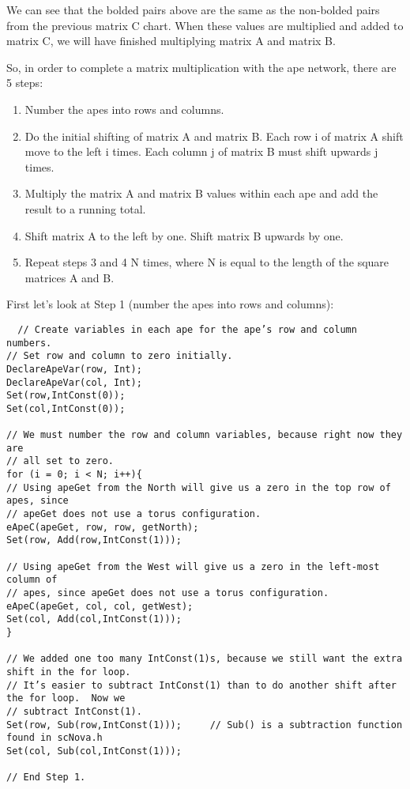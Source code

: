 \documentclass[10pt]{article}
\begin{document}
We can see that the bolded pairs above are the same as the non-bolded pairs from the previous matrix C chart.  When these values are multiplied and added to matrix C, we will have finished multiplying matrix A and matrix B. \par
So, in order to complete a matrix multiplication with the ape network, there are 5 steps: \par
\begin{enumerate}
\item Number the apes into rows and columns.
\item Do the initial shifting of matrix A and matrix B.  Each row i of matrix A shift move to the left i times.  Each column j of matrix B must shift upwards j times.
\item Multiply the matrix A and matrix B values within each ape and add the result to a running total.
\item Shift matrix A to the left by one.  Shift matrix B upwards by one. \par
\item Repeat steps 3 and 4 N times, where N is equal to the length of the square matrices A and B.
\end{enumerate}
First let’s look at Step 1 (number the apes into rows and columns): \par

\begin{verbatim}
  // Create variables in each ape for the ape’s row and column numbers.
// Set row and column to zero initially.
DeclareApeVar(row, Int);
DeclareApeVar(col, Int);
Set(row,IntConst(0));
Set(col,IntConst(0));

// We must number the row and column variables, because right now they are 
// all set to zero.
for (i = 0; i < N; i++){
// Using apeGet from the North will give us a zero in the top row of apes, since
// apeGet does not use a torus configuration.
eApeC(apeGet, row, row, getNorth);
Set(row, Add(row,IntConst(1)));

// Using apeGet from the West will give us a zero in the left-most column of
// apes, since apeGet does not use a torus configuration.
eApeC(apeGet, col, col, getWest);
Set(col, Add(col,IntConst(1)));
}

// We added one too many IntConst(1)s, because we still want the extra shift in the for loop.
// It’s easier to subtract IntConst(1) than to do another shift after the for loop.  Now we
// subtract IntConst(1).
Set(row, Sub(row,IntConst(1)));     // Sub() is a subtraction function found in scNova.h
Set(col, Sub(col,IntConst(1)));

// End Step 1.
\end{verbatim}
\end{document}
